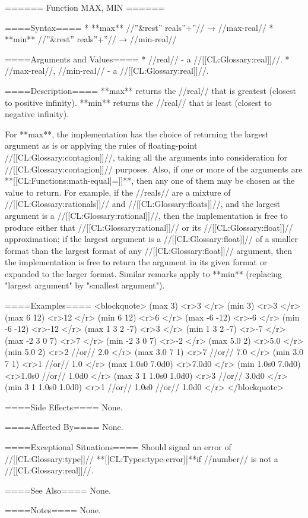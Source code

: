 ====== Function MAX, MIN ======

====Syntax====
  * **max** //''&rest'' reals''+''// → //max-real// 
  * **min** //''&rest'' reals''+''// → //min-real//

====Arguments and Values====
  * //real// - a //[[CL:Glossary:real]]//.
  * //max-real//, //min-real// - a //[[CL:Glossary:real]]//.

====Description====
**max** returns the //real// that is greatest (closest to positive infinity). **min** returns the //real// that is least (closest to negative infinity).

For **max**, the implementation has the choice of returning the largest argument as is or applying the rules of floating-point //[[CL:Glossary:contagion]]//, taking all the arguments into consideration for //[[CL:Glossary:contagion]]// purposes. Also, if one or more of the arguments are **[[CL:Functions:math-equal|=]]**, then any one of them may be chosen as the value to return. For example, if the //reals// are a mixture of //[[CL:Glossary:rationals]]// and //[[CL:Glossary:floats]]//, and the largest argument is a //[[CL:Glossary:rational]]//, then the implementation is free to produce either that //[[CL:Glossary:rational]]// or its //[[CL:Glossary:float]]// approximation; if the largest argument is a //[[CL:Glossary:float]]// of a smaller format than the largest format of any //[[CL:Glossary:float]]// argument, then the implementation is free to return the argument in its given format or expanded to the larger format. Similar remarks apply to **min** (replacing "largest argument" by "smallest argument").

====Examples====
<blockquote>
(max 3) <r>3 </r>
(min 3) <r>3 </r>
(max 6 12) <r>12 </r>
(min 6 12) <r>6 </r>
(max -6 -12) <r>-6 </r>
(min -6 -12) <r>-12 </r>
(max 1 3 2 -7) <r>3 </r>
(min 1 3 2 -7) <r>-7 </r>
(max -2 3 0 7) <r>7 </r>
(min -2 3 0 7) <r>-2 </r>
(max 5.0 2) <r>5.0 </r>
(min 5.0 2) <r>2 
//or// 2.0 </r>
(max 3.0 7 1) <r>7 
//or// 7.0 </r>
(min 3.0 7 1) <r>1 
//or// 1.0 </r>
(max 1.0s0 7.0d0) <r>7.0d0 </r>
(min 1.0s0 7.0d0) <r>1.0s0 
//or// 1.0d0 </r>
(max 3 1 1.0s0 1.0d0) <r>3 
//or// 3.0d0 </r>
(min 3 1 1.0s0 1.0d0) <r>1 
//or// 1.0s0 
//or// 1.0d0 </r>
</blockquote>

====Side Effects====
None.

====Affected By====
None.

====Exceptional Situations====
Should signal an error of //[[CL:Glossary:type]]// **[[CL:Types:type-error]]**if //number// is not a //[[CL:Glossary:real]]//.

====See Also====
None.

====Notes====
None.

